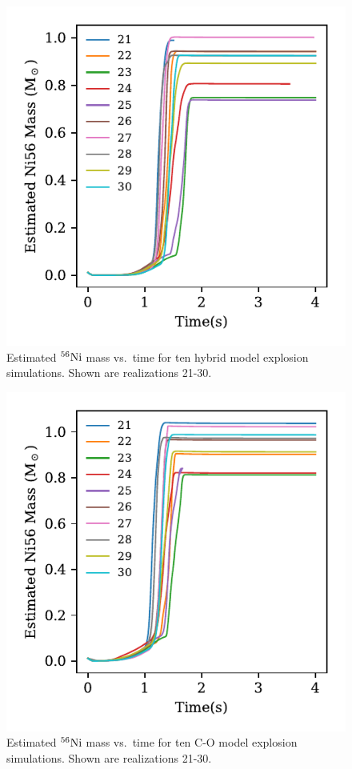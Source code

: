 \documentclass[iop,apj]{emulateapj}
\newcommand{\Ni}[1]{\ensuremath{{}^{#1}{\rm Ni}}}
\begin{document}
\begin{figure}
\includegraphics[width=\columnwidth]{figures/Hybrid_Ni56mass_v_time_plot.pdf}
\caption{\label{fig:nithybrid}
Estimated \Ni{56} mass vs.\ time for ten hybrid model explosion simulations. 
Shown are realizations 21-30. 
}
\end{figure}
\begin{figure}
\includegraphics[width=\columnwidth]{figures/CO_Ni56mass_v_time_plot.pdf}
\caption{\label{fig:nitco}
Estimated \Ni{56} mass vs.\ time for ten C-O model explosion simulations.
Shown are realizations 21-30. 
}
\end{figure}
\end{document}
